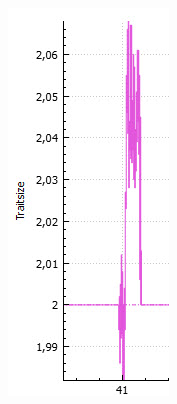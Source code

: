 \documentclass[11pt, a4paper, german]{article}
\theoremstyle{plain}
\begin{document}
\begin{center}
\begin{minipage}{1\textwidth}
\begin{minipage}{0.25\textwidth}
		\includegraphics[width=1\linewidth]{./Pictures/TSS_DomZoomVgl_original}

\end{minipage}
\end{minipage}
\end{center}
\end{document}
